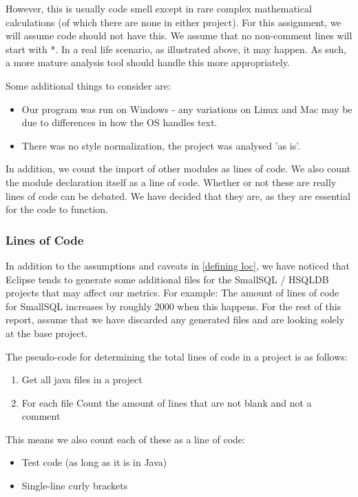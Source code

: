\documentclass{article}
\begin{document}
However, this is usually code smell except in rare complex mathematical calculations (of which there are none in either project). For this assignment, we will assume code should not have this. We assume that no non-comment lines will start with *.
In a real life scenario, as illustrated above, it may happen. As such, a more mature analysis tool should handle this more appropriately.

Some additional things to consider are:
\begin{itemize}
\item Our program was run on Windows - any variations on Linux and Mac may be due to differences in how the OS handles text. 
\item There was no style normalization, the project was analysed 'as is'.
\end{itemize}

In addition, we count the import of other modules as lines of code. We also count the module declaration itself as a line of code. Whether or not these are really lines of code can be debated. We have decided that they are, as they are essential for the code to function.

\subsubsection{Lines of Code}
In addition to the assumptions and caveats in \ref{defining loc}, we have noticed that Eclipse tends to generate some additional files for the SmallSQL / HSQLDB projects that may affect our metrics. For example: The amount of lines of code for SmallSQL increases by roughly 2000 when this happens.
For the rest of this report, assume that we have discarded any generated files and are looking solely at the base project.

The pseudo-code for determining the total lines of code in a project is as follows:
\begin{enumerate}
\item Get all java files in a project
\item For each file
\subitem Count the amount of lines that are not blank and not a comment
\end{enumerate}

This means we also count each of these as a line of code:
\begin{itemize}
\item Test code (as long as it is in Java)
\item Single-line curly brackets
\end{itemize}
\end{document}
